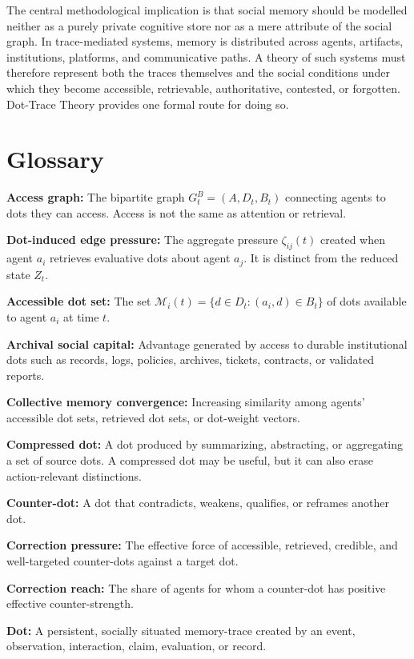 \documentclass[11pt]{article}
\theoremstyle{remark}
\begin{document}
The central methodological implication is that social memory should be modelled neither as a purely private cognitive store nor as a mere attribute of the social graph. In trace-mediated systems, memory is distributed across agents, artifacts, institutions, platforms, and communicative paths. A theory of such systems must therefore represent both the traces themselves and the social conditions under which they become accessible, retrievable, authoritative, contested, or forgotten. Dot-Trace Theory provides one formal route for doing so.
\appendix

\section{Glossary}\label{appendix-glossary}

\textbf{Access graph:} The bipartite graph $G_t^B=(A,D_t,B_t)$ connecting agents to dots they can access. Access is not the same as attention or retrieval.

\textbf{Dot-induced edge pressure:} The aggregate pressure $\zeta_{ij}(t)$ created when agent $a_i$ retrieves evaluative dots about agent $a_j$. It is distinct from the reduced state $Z_t$.

\textbf{Accessible dot set:} The set $\mathcal M_i(t)=\{d\in D_t:(a_i,d)\in B_t\}$ of dots available to agent $a_i$ at time $t$.

\textbf{Archival social capital:} Advantage generated by access to durable institutional dots such as records, logs, policies, archives, tickets, contracts, or validated reports.

\textbf{Collective memory convergence:} Increasing similarity among agents' accessible dot sets, retrieved dot sets, or dot-weight vectors.

\textbf{Compressed dot:} A dot produced by summarizing, abstracting, or aggregating a set of source dots. A compressed dot may be useful, but it can also erase action-relevant distinctions.

\textbf{Counter-dot:} A dot that contradicts, weakens, qualifies, or reframes another dot.

\textbf{Correction pressure:} The effective force of accessible, retrieved, credible, and well-targeted counter-dots against a target dot.

\textbf{Correction reach:} The share of agents for whom a counter-dot has positive effective counter-strength.

\textbf{Dot:} A persistent, socially situated memory-trace created by an event, observation, interaction, claim, evaluation, or record.
\end{document}
